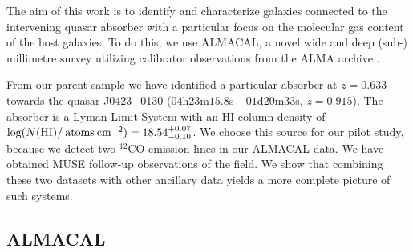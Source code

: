 \documentclass[a4paper,fleqn,usenatbib]{mnras}
\begin{document}
The aim of this work is to identify and characterize galaxies connected to the intervening quasar absorber with a particular focus on the molecular gas content of the host galaxies. 
To do this, we use ALMACAL, a novel wide and deep (sub-) millimetre survey utilizing calibrator observations from the ALMA archive \mbox{\citep{Oteo2016ALMACAL}}.

From our parent sample we have identified a particular absorber at $z = 0.633$ towards the quasar J0423$-$0130 ($04$h$23$m$15.8$s $-01$d$20$m$33$s, $z = 0.915$). The absorber is a Lyman Limit System with an HI column density of $\log (N(\rm{HI}) /\: \text{atoms} \: \text{cm}^{-2}) = 18.54^{+0.07}_{-0.10}$. We choose this source for our pilot study, because we detect two $^{12}$CO emission lines in our ALMACAL data. We have obtained MUSE follow-up observations of the field. We show that combining these two datasets with other ancillary data yields a more complete picture of such systems.


\subsection{ALMACAL}
\label{SecALMACAL}
\end{document}
